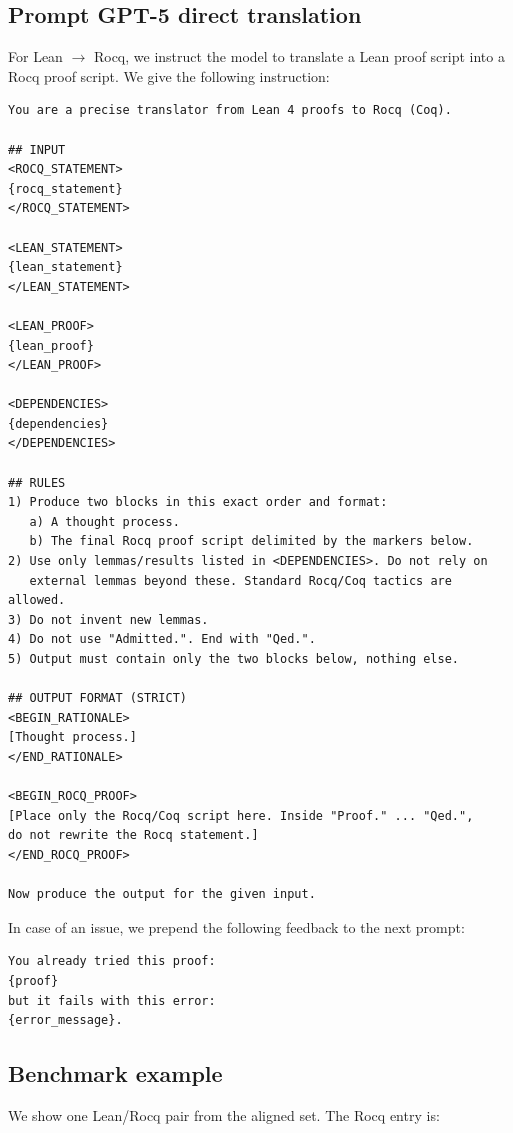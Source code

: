 \documentclass{article}
\begin{document}
\subsection{Prompt GPT-5 direct translation}
\label{app:promptgpt}
For Lean $\to$ Rocq, we instruct the model to translate a Lean proof script into a Rocq proof script. We give the following instruction:
\begin{verbatim}
You are a precise translator from Lean 4 proofs to Rocq (Coq).

## INPUT
<ROCQ_STATEMENT>
{rocq_statement}
</ROCQ_STATEMENT>

<LEAN_STATEMENT>
{lean_statement}
</LEAN_STATEMENT>

<LEAN_PROOF>
{lean_proof}
</LEAN_PROOF>

<DEPENDENCIES>
{dependencies}
</DEPENDENCIES>

## RULES
1) Produce two blocks in this exact order and format:
   a) A thought process.
   b) The final Rocq proof script delimited by the markers below.
2) Use only lemmas/results listed in <DEPENDENCIES>. Do not rely on
   external lemmas beyond these. Standard Rocq/Coq tactics are allowed.
3) Do not invent new lemmas.
4) Do not use "Admitted.". End with "Qed.".
5) Output must contain only the two blocks below, nothing else.

## OUTPUT FORMAT (STRICT)
<BEGIN_RATIONALE>
[Thought process.]
</END_RATIONALE>

<BEGIN_ROCQ_PROOF>
[Place only the Rocq/Coq script here. Inside "Proof." ... "Qed.",
do not rewrite the Rocq statement.]
</END_ROCQ_PROOF>

Now produce the output for the given input.
\end{verbatim}

In case of an issue, we prepend the following feedback to the next prompt:
\begin{verbatim}
You already tried this proof:
{proof}
but it fails with this error:
{error_message}.
\end{verbatim}

\subsection{Benchmark example}
\label{app:benchmark}
We show one Lean/Rocq pair from the aligned set. The Rocq entry is:
\end{document}
